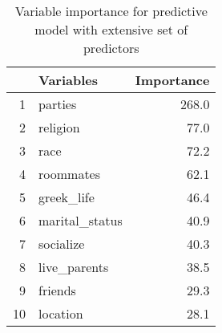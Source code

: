 \begin{table}[ht]
\centering
\begin{tabular}{rlr}
  \hline
 & Variables & Importance \\ 
  \hline
1 & parties & 268.0 \\ 
  2 & religion & 77.0 \\ 
  3 & race & 72.2 \\ 
  4 & roommates & 62.1 \\ 
  5 & greek\_life & 46.4 \\ 
  6 & marital\_status & 40.9 \\ 
  7 & socialize & 40.3 \\ 
  8 & live\_parents & 38.5 \\ 
  9 & friends & 29.3 \\ 
  10 & location & 28.1 \\ 
   \hline
\end{tabular}
\caption{Variable importance for predictive model with extensive set of predictors} 
\end{table}
